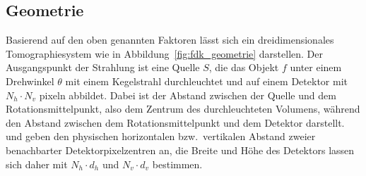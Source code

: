 \subsection{Geometrie}\label{ssec:fdk_geometrie}

Basierend auf den oben genannten Faktoren lässt sich ein dreidimensionales Tomographiesystem wie in
Abbildung~\ref{fig:fdk_geometrie} darstellen. Der Ausgangspunkt der Strahlung ist eine Quelle $S$, die das Objekt $f$
unter einem Drehwinkel $\theta$ mit einem Kegelstrahl durchleuchtet und auf einem Detektor mit $N_h \cdot N_v$
\gls{pixel}n abbildet. Dabei ist  der Abstand zwischen der Quelle und dem Rotationsmittelpunkt, also
dem Zentrum des durchleuchteten Volumens, während  den Abstand zwischen dem Rotationsmittelpunkt und dem
Detektor darstellt.  und  geben den physischen horizontalen bzw.\ vertikalen Abstand zweier
benachbarter Detektorpixelzentren an, die Breite und Höhe des Detektors lassen sich daher mit $N_h \cdot d_h$ und
$N_v \cdot d_v$ bestimmen.

